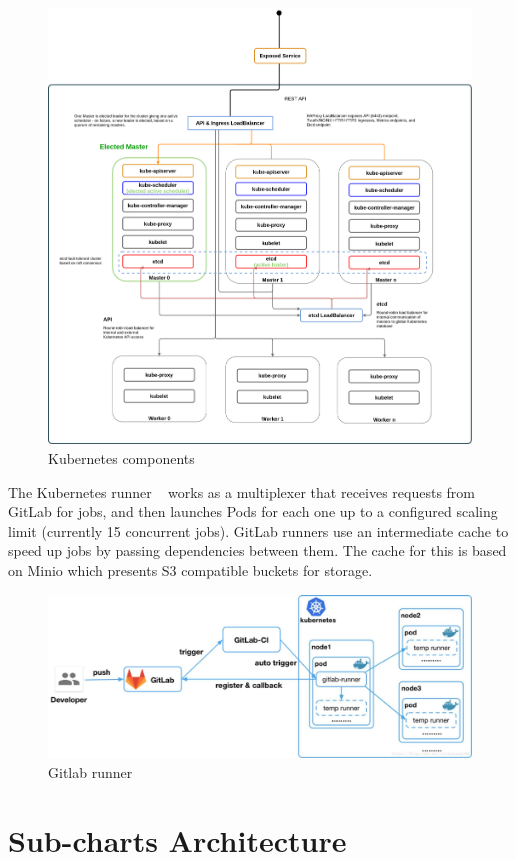 \documentclass[a4paper,
               keeplastbox,   %
               ]{jacow}
\begin{document}
\begin{figure}[!htb]
    \centering
    \includegraphics*[width=0.8\columnwidth]{k8s}
    \caption{Kubernetes components}
    \label{fig:k8s}
 \end{figure}

The Kubernetes runner ~\cite{gitlabrunner} works as a multiplexer that receives requests from GitLab for jobs, and then launches Pods for each one up to a configured scaling limit (currently 15 concurrent jobs). GitLab runners use an intermediate cache to speed up jobs by passing dependencies between them.  The cache for this is based on Minio which presents S3 compatible buckets for storage.

\begin{figure}[!htb]
    \centering
    \includegraphics*[width=0.8\columnwidth]{gitlab-runner}
    \caption{Gitlab runner}
    \label{fig:gitlab-runner}
\end{figure}

\section{Sub-charts Architecture}
\end{document}
